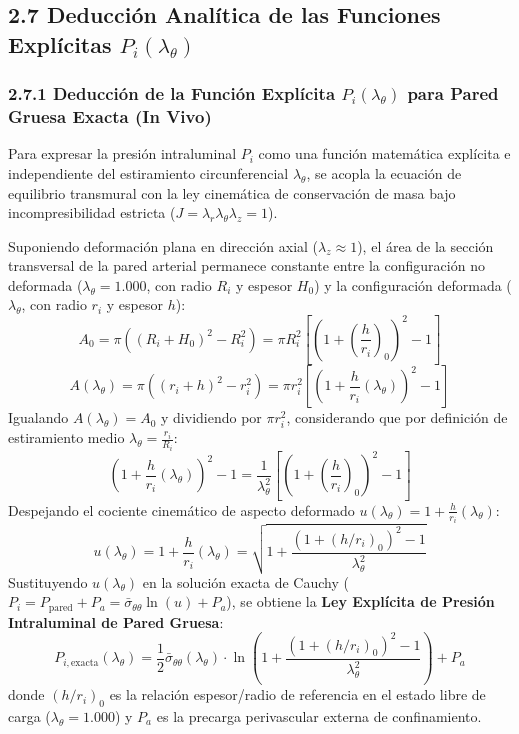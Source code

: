 \documentclass[10pt,a4paper]{article}
\begin{document}
\subsection{2.7 Deducción Analítica de las Funciones Explícitas $P_i(\lambda_\theta)$}

\subsubsection{2.7.1 Deducción de la Función Explícita $P_i(\lambda_\theta)$ para Pared Gruesa Exacta (In Vivo)}
Para expresar la presión intraluminal $P_i$ como una función matemática explícita e independiente del estiramiento circunferencial $\lambda_\theta$, se acopla la ecuación de equilibrio transmural con la ley cinemática de conservación de masa bajo incompresibilidad estricta ($J = \lambda_r \lambda_\theta \lambda_z = 1$).

Suponiendo deformación plana en dirección axial ($\lambda_z \approx 1$), el área de la sección transversal de la pared arterial permanece constante entre la configuración no deformada ($\lambda_\theta = 1.000$, con radio $R_i$ y espesor $H_0$) y la configuración deformada ($\lambda_\theta$, con radio $r_i$ y espesor $h$):
\begin{equation}
A_0 = \pi \left( (R_i + H_0)^2 - R_i^2 \right) = \pi R_i^2 \left[ \left(1 + \left(\frac{h}{r_i}\right)_0\right)^2 - 1 \right]
\end{equation}
\begin{equation}
A(\lambda_\theta) = \pi \left( (r_i + h)^2 - r_i^2 \right) = \pi r_i^2 \left[ \left(1 + \frac{h}{r_i}(\lambda_\theta)\right)^2 - 1 \right]
\end{equation}
Igualando $A(\lambda_\theta) = A_0$ y dividiendo por $\pi r_i^2$, considerando que por definición de estiramiento medio $\lambda_\theta = \frac{r_i}{R_i}$:
\begin{equation}
\left(1 + \frac{h}{r_i}(\lambda_\theta)\right)^2 - 1 = \frac{1}{\lambda_\theta^2} \left[ \left(1 + \left(\frac{h}{r_i}\right)_0\right)^2 - 1 \right]
\end{equation}
Despejando el cociente cinemático de aspecto deformado $u(\lambda_\theta) = 1 + \frac{h}{r_i}(\lambda_\theta)$:
\begin{equation}
u(\lambda_\theta) = 1 + \frac{h}{r_i}(\lambda_\theta) = \sqrt{1 + \frac{\left(1 + (h/r_i)_0\right)^2 - 1}{\lambda_\theta^2}}
\end{equation}
Sustituyendo $u(\lambda_\theta)$ en la solución exacta de Cauchy ($P_i = P_{\text{pared}} + P_a = \bar{\sigma}_{\theta\theta} \ln(u) + P_a$), se obtiene la \textbf{Ley Explícita de Presión Intraluminal de Pared Gruesa}:
\begin{equation}
P_{i,\text{exacta}}(\lambda_\theta) = \frac{1}{2} \bar{\sigma}_{\theta\theta}(\lambda_\theta) \cdot \ln\left( 1 + \frac{\left(1 + (h/r_i)_0\right)^2 - 1}{\lambda_\theta^2} \right) + P_a
\end{equation}
donde $(h/r_i)_0$ es la relación espesor/radio de referencia en el estado libre de carga ($\lambda_\theta = 1.000$) y $P_a$ es la precarga perivascular externa de confinamiento.
\end{document}

